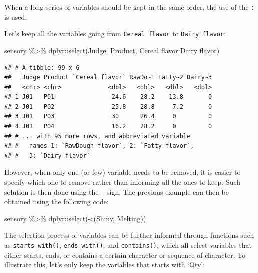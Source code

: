 \documentclass[
]{krantz}
\makeatletter
\newenvironment{Shaded}{\begin{snugshade}}{\end{snugshade}}
\newcommand{\AttributeTok}[1]{\textcolor[rgb]{0.61,0.61,0.61}{#1}}
\newcommand{\FunctionTok}[1]{\textcolor[rgb]{0,0,0}{#1}}
\newcommand{\NormalTok}[1]{#1}
\newcommand{\SpecialCharTok}[1]{\textcolor[rgb]{0,0,0}{#1}}
\newcommand{\StringTok}[1]{\textcolor[rgb]{0.5,0.5,0.5}{#1}}
\newenvironment{kframe}{%
\medskip{}
\setlength{\fboxsep}{.8em}
 \def\at@end@of@kframe{}%
 \ifinner\ifhmode%
  \def\at@end@of@kframe{\end{minipage}}%
  \begin{minipage}{\columnwidth}%
 \fi\fi%
 \def\FrameCommand##1{\hskip\@totalleftmargin \hskip-\fboxsep
 \colorbox{shadecolor}{##1}\hskip-\fboxsep
     \hskip-\linewidth \hskip-\@totalleftmargin \hskip\columnwidth}%
 \MakeFramed {\advance\hsize-\width
   \@totalleftmargin\z@ \linewidth\hsize
   \@setminipage}}%
 {\par\unskip\endMakeFramed%
 \at@end@of@kframe}
\renewenvironment{Shaded}{\begin{kframe}}{\end{kframe}}
\makeatother
\begin{document}
When a long series of variables should be kept in the same order, the use of the \texttt{:} is used.

Let's keep all the variables going from \texttt{Cereal\ flavor} to \texttt{Dairy\ flavor}:

\begin{Shaded}
\begin{Highlighting}[]
\NormalTok{sensory }\SpecialCharTok{\%\textgreater{}\%}
\NormalTok{  dplyr}\SpecialCharTok{::}\FunctionTok{select}\NormalTok{(Judge, Product, }\StringTok{\textasciigrave{}}\AttributeTok{Cereal flavor}\StringTok{\textasciigrave{}}\SpecialCharTok{:}\StringTok{\textasciigrave{}}\AttributeTok{Dairy flavor}\StringTok{\textasciigrave{}}\NormalTok{)}
\end{Highlighting}
\end{Shaded}

\begin{verbatim}
## # A tibble: 99 x 6
##   Judge Product `Cereal flavor` RawDo~1 Fatty~2 Dairy~3
##   <chr> <chr>             <dbl>   <dbl>   <dbl>   <dbl>
## 1 J01   P01                24.6    28.2    13.8       0
## 2 J01   P02                25.8    28.8     7.2       0
## 3 J01   P03                30      26.4     0         0
## 4 J01   P04                16.2    28.2     0         0
## # ... with 95 more rows, and abbreviated variable
## #   names 1: `RawDough flavor`, 2: `Fatty flavor`,
## #   3: `Dairy flavor`
\end{verbatim}

However, when only one (or few) variable needs to be removed, it is easier to specify which one to remove rather than informing all the ones to keep. Such solution is then done using the \texttt{-} sign. The previous example can then be obtained using the following code:

\begin{Shaded}
\begin{Highlighting}[]
\NormalTok{sensory }\SpecialCharTok{\%\textgreater{}\%}
\NormalTok{  dplyr}\SpecialCharTok{::}\FunctionTok{select}\NormalTok{(}\SpecialCharTok{{-}}\FunctionTok{c}\NormalTok{(Shiny, Melting))}
\end{Highlighting}
\end{Shaded}

The selection process of variables can be further informed through functions such as \texttt{starts\_with()}, \texttt{ends\_with()}, and \texttt{contains()}, which all select variables that either starts, ends, or contains a certain character or sequence of character. To illustrate this, let's only keep the variables that starts with `Qty':
\end{document}

